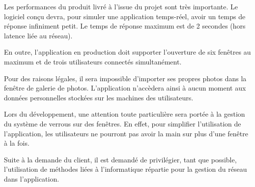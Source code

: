 Les performances du produit livré à l'issue du projet sont très 
importante. Le logiciel conçu devra, pour simuler une application
temps-réel, avoir un temps de réponse infiniment petit. Le temps
de réponse maximum est de 2 secondes (hors latence liée au réseau).

En outre, l'application en production doit supporter l'ouverture de 
six fenêtres au maximum et de trois utilisateurs connectés simultanément.

Pour des raisons légales, il sera impossible d'importer ses propres
photos dans la fenêtre de galerie de photos. L'application n'accèdera
ainsi à aucun moment aux données personnelles stockées sur les machines
des utilisateurs.

Lors du développement, une attention toute particulière sera portée
à la gestion du système de verrous sur des fenêtres. En effet, pour 
simplifier l'utilisation de l'application, les utilisateurs ne 
pourront pas avoir la main sur plus d'une fenêtre à la fois.

Suite à la demande du client, il est demandé de privilégier, tant que
possible, l'utilisation de méthodes liées à l'informatique répartie pour
la gestion du réseau dans l'application.

